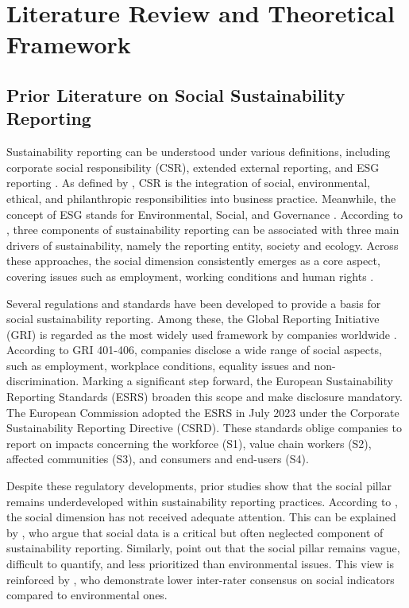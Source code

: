 \chapter{Literature Review and Theoretical Framework}
\label{chap:background}
\section{Prior Literature on Social Sustainability Reporting}

Sustainability reporting can be understood under various definitions, 
including corporate social responsibility (CSR), extended external reporting, 
and ESG reporting \parencite{Edge2022}. As defined by \parencite{Rasche2017}, CSR is the integration of social, 
environmental, ethical, and philanthropic responsibilities into business practice. 
Meanwhile, the concept of ESG stands for Environmental, Social, and Governance \parencite{UNGlobal2024}.
According to \parencite{Krivogorsky2024}, three components of sustainability reporting 
can be associated with three main drivers of sustainability, namely the reporting entity, 
society and ecology. Across these approaches, the social dimension consistently emerges 
as a core aspect, covering issues such as employment, working conditions 
and human rights \parencite{Fiechter2022, Morais2018}.

Several regulations and standards have been developed to provide a basis for social sustainability reporting.
Among these, the Global Reporting Initiative (GRI) is regarded as the most widely used framework 
by companies worldwide \parencite{Bais2024, vanOorschot2024}. 
According to GRI 401-406, companies disclose a wide range of social aspects, such as employment,
workplace conditions, equality issues and non-discrimination.
Marking a significant step forward, the European Sustainability Reporting Standards (ESRS) 
broaden this scope and make disclosure mandatory. The European Commission adopted the ESRS 
in July 2023 under the Corporate Sustainability Reporting Directive (CSRD). These standards 
oblige companies to report on impacts concerning the workforce (S1), value chain workers (S2), 
affected communities (S3), and consumers and end-users (S4).

Despite these regulatory developments, prior studies show that the social pillar remains underdeveloped 
within sustainability reporting practices. According to \textcite{Heldal2024}, the social dimension 
has not received adequate attention. This can be explained by \textcite{Sharma2024}, who argue that
social data is a critical but often neglected component of sustainability reporting. Similarly, 
\textcite{Morais2018} point out that the social pillar remains vague, difficult to quantify, 
and less prioritized than environmental issues. This view is reinforced by \textcite{Berg2022}, 
who demonstrate lower inter-rater consensus on social indicators compared to environmental ones.

